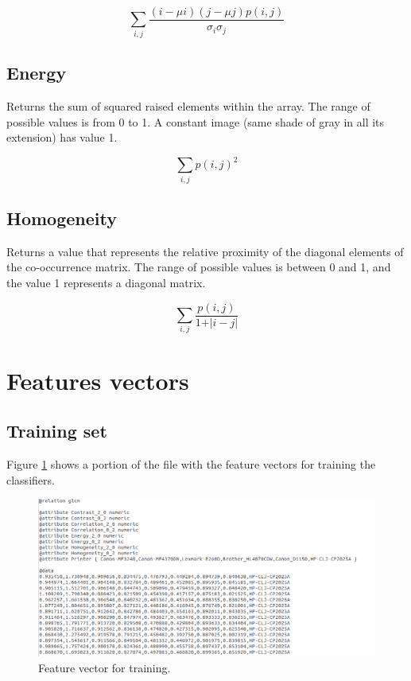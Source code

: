 \documentclass[10pt,twocolumn,letterpaper]{article}
\begin{document}
$$\sum_{i,j} \frac{(i - \mu i) (j - \mu j) p(i,j)} {\sigma_i \sigma_j}$$

\subsection{Energy}

Returns the sum of squared raised elements within the array. The range of possible values is from 0 to 1. A constant image (same shade of gray in all its extension) has value 1.

$$\sum_{i,j} p(i, j)^2$$

\subsection{Homogeneity}

Returns a value that represents the relative proximity of the diagonal elements of the co-occurrence matrix. The range of possible values is between 0 and 1, and the value 1 represents a diagonal matrix.

$$\sum_{i,j} \frac{p(i, j)}{1 + \vert i - j \lvert}$$

\section{Features vectors}

\subsection{Training set}

Figure \ref{fig:feature_vector} shows a portion of the file with the feature vectors for training the classifiers.

\begin{figure}
\begin{center}
	\includegraphics[width=2\columnwidth]{feature_vector}
	\caption{Feature vector for training.}
\label{fig:feature_vector}   
\end{center} 
\end{figure}
\end{document}
